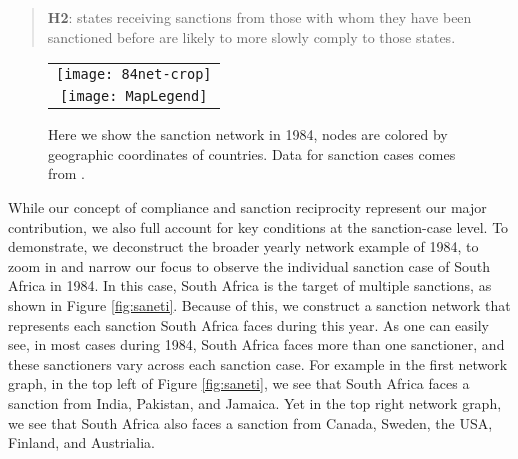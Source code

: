 \begin{quote}
	\textbf{H2}: states receiving sanctions from those with whom they have been sanctioned before are likely to more slowly comply to those states.
\end{quote}

\begin{figure}[ht]
  \centering
  \begin{tabular}{c}
	  \texttt{[image: 84net-crop]} \\
	  \texttt{[image: MapLegend]}
  \end{tabular}
  \caption{Here we show the sanction network in 1984, nodes are colored by geographic coordinates of countries. Data for sanction cases comes from \citet{morgan2009threat}.}
  \label{fig:spaghetti}
\end{figure}
\FloatBarrier

While our concept of compliance and sanction reciprocity represent our major contribution, we also full account for key conditions at the sanction-case level. To demonstrate, we deconstruct the broader yearly network example of 1984, to zoom in and narrow our focus to observe the individual sanction case of South Africa in 1984. In this case, South Africa is the target of multiple sanctions, as shown in Figure \ref{fig:saneti}. Because of this, we construct a sanction network that represents each sanction South Africa faces during this year. As one can easily see, in most cases during 1984, South Africa faces more than one sanctioner, and these sanctioners vary across each sanction case. For example in the first network graph, in the top left of Figure \ref{fig:saneti}, we see that South Africa faces a sanction from India, Pakistan, and Jamaica. Yet in the top right network graph, we see that South Africa also faces a sanction from Canada, Sweden, the USA, Finland, and Austrialia. 

